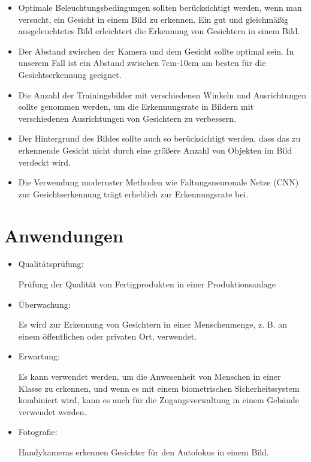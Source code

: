\begin{itemize}
	\item Optimale Beleuchtungsbedingungen sollten berücksichtigt werden, wenn man versucht, ein Gesicht in einem Bild zu erkennen. Ein gut und gleichmäßig ausgeleuchtetes Bild erleichtert die Erkennung von Gesichtern in einem Bild.
	\item Der Abstand zwischen der Kamera und dem Gesicht sollte optimal sein. In unserem Fall ist ein Abstand zwischen 7cm-10cm am besten für die Gesichtserkennung geeignet.
	\item Die Anzahl der Trainingsbilder mit verschiedenen Winkeln und Ausrichtungen sollte genommen werden, um die Erkennungsrate in Bildern mit verschiedenen Ausrichtungen von Gesichtern zu verbessern.
	\item Der Hintergrund des Bildes sollte auch so berücksichtigt werden, dass das zu erkennende Gesicht nicht durch eine größere Anzahl von Objekten im Bild verdeckt wird.
	\item Die Verwendung modernster Methoden wie Faltungsneuronale Netze (CNN) zur Gesichtserkennung trägt erheblich zur Erkennungsrate bei.
\end{itemize}

\section{Anwendungen}

\begin{itemize}
	\item Qualitätsprüfung: 
	
	Prüfung der Qualität von Fertigprodukten in einer Produktionsanlage
	\item Überwachung: 
	
	Es wird zur Erkennung von Gesichtern in einer Menschenmenge, z. B. an einem öffentlichen oder privaten Ort, verwendet.
	\item Erwartung: 
	
	Es kann verwendet werden, um die Anwesenheit von Menschen in einer Klasse zu erkennen, und wenn es mit einem biometrischen Sicherheitssystem kombiniert wird, kann es auch für die Zugangsverwaltung in einem Gebäude verwendet werden.
	
	\item Fotografie: 
	
	Handykameras erkennen Gesichter für den Autofokus in einem Bild.
\end{itemize}
